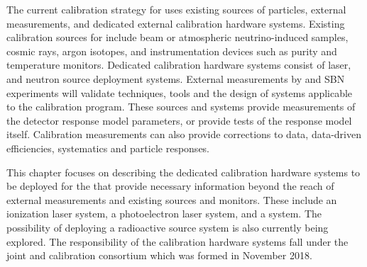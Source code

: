The current calibration strategy for  uses existing sources of particles, external measurements, and dedicated external calibration hardware systems. Existing calibration sources for  include beam or atmospheric neutrino-induced samples, cosmic rays, argon isotopes, and instrumentation devices such as \lar purity and temperature monitors. Dedicated calibration hardware systems consist of laser, and neutron source deployment systems.  External measurements by  and SBN experiments  will validate techniques, tools and the design of systems applicable to the  calibration program. These sources and systems provide measurements of the detector response model parameters, or provide tests of the response model itself. Calibration measurements can also provide corrections to data, data-driven efficiencies, systematics and particle responses.


This chapter focuses on describing the dedicated calibration hardware systems to be deployed for the   that provide necessary information beyond the reach of external measurements and existing sources and monitors. These include an ionization laser system, a photoelectron laser system, and a  system. The possibility of deploying a radioactive source system is also currently being explored. The responsibility of the calibration hardware systems fall under the joint  and  calibration consortium which was formed in November 2018.


